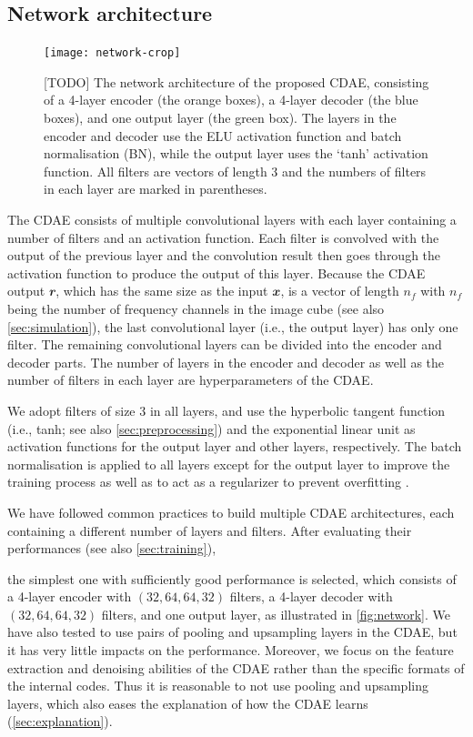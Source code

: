 \documentclass[fleqn,usenatbib]{mnras}
\newcommand{\B}[1]{\mathbfit{#1}}
\newcommand{\editwip}[1]{{\leavevmode\color{magenta}#1}}
\begin{document}
\subsection{Network architecture}
\label{sec:architecture}

\begin{figure}
  \centering
  \texttt{[image: network-crop]}
  \caption{\label{fig:network}%
    [TODO]
    The network architecture of the proposed CDAE, consisting of a
    4-layer encoder (the orange boxes), a 4-layer decoder (the blue
    boxes), and one output layer (the green box).
    The layers in the encoder and decoder use the ELU activation
    function and batch normalisation (BN), while the output layer uses
    the `tanh' activation function.
    All filters are vectors of length 3 and the numbers of filters in
    each layer are marked in parentheses.
  }
\end{figure}

\editwip{%
The CDAE consists of multiple convolutional layers with each layer
containing a number of filters and an activation function.
Each filter is convolved with the output of the previous layer and the
convolution result then goes through the activation function to produce
the output of this layer.
Because the CDAE output $\B{r}$, which has the same size as the input
$\B{x}$, is a vector of length $n_f$ with $n_f$ being the number of
frequency channels in the image cube (see also \autoref{sec:simulation}),
the last convolutional layer (i.e., the output layer) has only one filter.
The remaining convolutional layers can be divided into the encoder and
decoder parts.
The number of layers in the encoder and decoder as well as the number of
filters in each layer are hyperparameters of the CDAE.

We adopt filters of size 3 in all layers, and use the hyperbolic tangent
function (i.e., tanh; see also \autoref{sec:preprocessing}) and the
exponential linear unit \citep{clevert2016} as activation functions for the
output layer and other layers, respectively.
The batch normalisation is applied to all layers except for the output
layer to improve the training process as well as to act as a regularizer
to prevent overfitting \citep{ioffe2015}.

We have followed common practices \citep[e.g.,][]{suganuma2018,geron2017}
to build multiple CDAE architectures, each containing a different number of
layers and filters.
After evaluating their performances (see also \autoref{sec:training}),} %
the simplest one with sufficiently good performance is selected,
which consists of a 4-layer encoder with $(32,64,64,32)$ filters,
a 4-layer decoder with $(32,64,64,32)$ filters, and one output layer,
as illustrated in \autoref{fig:network}.
\editwip{%
We have also tested to use pairs of pooling and upsampling layers in the
CDAE, but it has very little impacts on the performance.
Moreover, we focus on the feature extraction and denoising abilities of the
CDAE rather than the specific formats of the internal codes.
Thus it is reasonable to not use pooling and upsampling layers, which also
eases the explanation of how the CDAE learns (\autoref{sec:explanation}).
}
\end{document}
